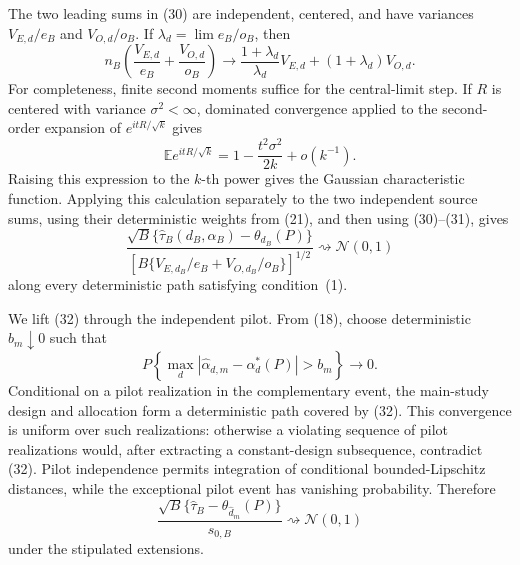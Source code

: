 The two leading sums in (30) are independent, centered, and have variances \(V_{E,d}/e_B\) and \(V_{O,d}/o_B\). If \(\lambda_d=\lim e_B/o_B\), then
\[
n_B\left(\frac{V_{E,d}}{e_B}+\frac{V_{O,d}}{o_B}\right)
\longrightarrow
\frac{1+\lambda_d}{\lambda_d}V_{E,d}
+(1+\lambda_d)V_{O,d}. \tag{31}
\]
For completeness, finite second moments suffice for the central-limit step. If \(R\) is centered with variance \(\sigma^2<\infty\), dominated convergence applied to the second-order expansion of \(e^{itR/\sqrt{k}}\) gives
\[
\mathbb E e^{itR/\sqrt{k}}
=1-\frac{t^2\sigma^2}{2k}+o(k^{-1}).
\]
Raising this expression to the \(k\)-th power gives the Gaussian characteristic function. Applying this calculation separately to the two independent source sums, using their deterministic weights from (21), and then using (30)--(31), gives
\[
\frac{\sqrt B\{\widehat\tau_B(d_B,\alpha_B)-\theta_{d_B}(P)\}}
{\left[B\{V_{E,d_B}/e_B+V_{O,d_B}/o_B\}\right]^{1/2}}
\rightsquigarrow\mathcal N(0,1) \tag{32}
\]
along every deterministic path satisfying condition~(1).

We lift (32) through the independent pilot. From (18), choose deterministic \(b_m\downarrow0\) such that
\[
P\!\left\{\max_d|\widehat\alpha_{d,m}-\alpha_d^*(P)|>b_m\right\}\to0. \tag{33}
\]
Conditional on a pilot realization in the complementary event, the main-study design and allocation form a deterministic path covered by (32). This convergence is uniform over such realizations: otherwise a violating sequence of pilot realizations would, after extracting a constant-design subsequence, contradict (32). Pilot independence permits integration of conditional bounded-Lipschitz distances, while the exceptional pilot event has vanishing probability. Therefore
\[
\frac{\sqrt B\{\widehat\tau_B-\theta_{\widehat d_m}(P)\}}{s_{0,B}}
\rightsquigarrow\mathcal N(0,1) \tag{34}
\]
under the stipulated extensions.

